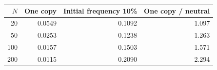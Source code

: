\begin{tabular}{rrrr}\toprule
\(N\) & One copy & Initial frequency 10\% & One copy / neutral\\\midrule
20 & 0.0549 & 0.1092 & 1.097 \\
50 & 0.0253 & 0.1238 & 1.263 \\
100 & 0.0157 & 0.1503 & 1.571 \\
200 & 0.0115 & 0.2090 & 2.294 \\
\bottomrule\end{tabular}
